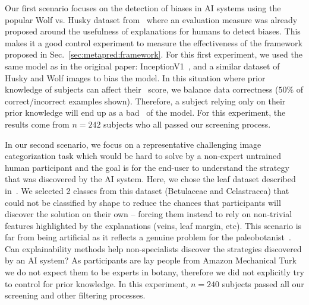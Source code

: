 Our first scenario focuses on the detection of biases in AI systems using the popular Wolf vs. Husky dataset from~\cite{ribeiro2016lime} where an evaluation measure was already proposed around the usefulness of explanations for humans to detect biases. This makes it a good control experiment to measure the effectiveness of the framework proposed in Sec.~\ref{sec:metapred:framework}.
For this first experiment, we used the same model as in the original paper: InceptionV1~\cite{szegedy2015going}, and a similar dataset of Husky and Wolf images to bias the model. In this situation where prior knowledge of subjects can affect their \mp~score, we balance data correctness ($50\%$ of correct/incorrect examples shown). Therefore, a subject relying only on their prior knowledge will  end up as a bad \mp~of the model. For this experiment, the results come from $n=242$ subjects who all passed our screening process.

In our second scenario, we focus on a representative challenging image categorization task which would be hard to solve by a non-expert untrained human participant and the goal is for the end-user to understand the strategy that was discovered by the AI system. Here, we chose the leaf dataset described in~\cite{wilf2016computer}. We selected 2 classes from this dataset (Betulaceae and Celastracea) that could not be classified by shape to reduce the chances that participants will discover the solution on their own -- forcing them instead to rely on non-trivial features highlighted by the explanations (veins, leaf margin, etc). This scenario is far from being artificial as it reflects a genuine problem for the paleobotanist~\cite{spagnuolo2022decoding}. Can explainability methods help non-specialists discover the strategies discovered by an AI system? As participants are lay people from Amazon Mechanical Turk we do not expect them to be experts in botany, therefore we did not explicitly try to control for prior knowledge. In this experiment, $n=240$ subjects passed all our screening and other filtering processes. 

